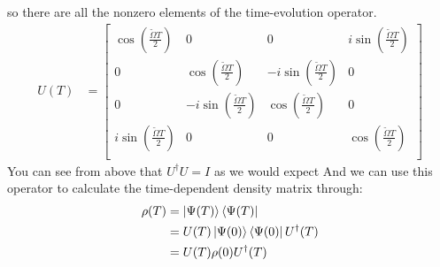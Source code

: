 so there are all the nonzero elements of the time-evolution operator.
\begin{align*}
	U(T) &= \begin{bmatrix}
		\cos \left(\frac{\tilde{\Omega} T}{2} \right) & 0 & 0 & i\sin \left(\frac{\tilde{\Omega} T}{2} \right) \\
		0 & \cos \left(\frac{\tilde{\Omega} T}{2} \right) & -i\sin \left(\frac{\tilde{\Omega} T}{2} \right) & 0\\
		0 & -i\sin \left(\frac{\tilde{\Omega} T}{2} \right)  & \cos \left(\frac{\tilde{\Omega} T}{2} \right) & 0\\
		i\sin \left(\frac{\tilde{\Omega} T}{2} \right)  & 0 & 0 & \cos \left(\frac{\tilde{\Omega} T}{2} \right) \\
	\end{bmatrix}
\end{align*}
You can see from above that $U^{\dagger}U = I$ as we would expect
And we can use this operator to calculate the time-dependent density matrix through:
\begin{align*}
	\rho(T) &= \ket{\Psi(T)}\bra{\Psi(T)} \\
	&= U(T) \ket{\Psi(0)}\bra{\Psi(0)} U^{\dagger}(T)\\
	&= U(T) \rho(0) U^{\dagger}(T)
\end{align*}
